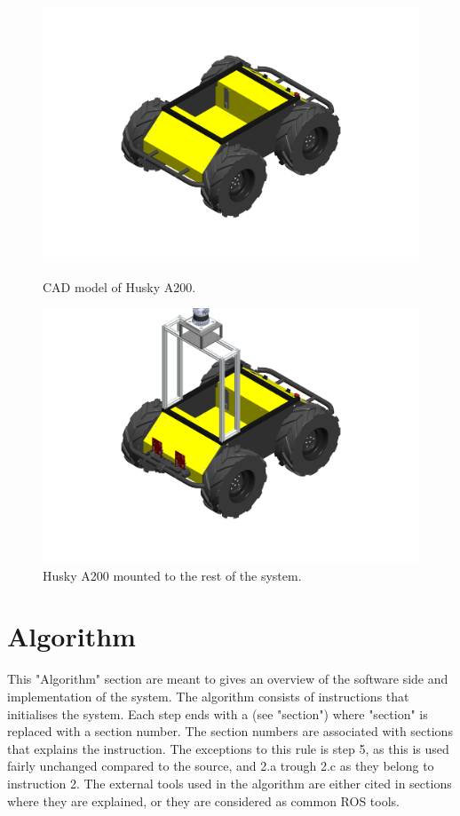 \begin{figure}[H]
    \centering
    \begin{minipage}[b]{0.49\textwidth}
        \includegraphics[width=\textwidth]{Figures/CAD/husky.PNG}
        \caption{CAD model of Husky A200.}
        \label{fig:husky}
    \end{minipage}
    \begin{minipage}[b]{0.49\textwidth}
        \includegraphics[width=\textwidth]{Figures/CAD/huskyMounted.PNG}
        \caption{Husky A200 mounted to the rest of the system.}
        \label{fig:huskyMounted}
    \end{minipage}
\end{figure}

\section{Algorithm}\label{sec:Algorithm}
This "Algorithm" section are meant to gives an overview of the software side and implementation of the system. The algorithm consists of instructions that initialises the system. Each step ends with a (see "section") where "section" is replaced with a section number. The section numbers are associated with sections that explains the instruction. The exceptions to this rule is step 5, as this is used fairly unchanged compared to the source, and 2.a trough 2.c as they belong to instruction 2. The external tools used in the algorithm are either cited in sections where they are explained, or they are considered as common ROS tools.

